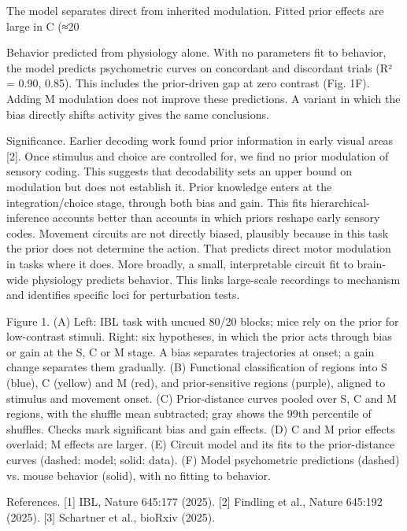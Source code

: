 \documentclass[12pt]{article}
\begin{document}
The model separates direct from inherited modulation. Fitted prior effects are large in C (≈20%

Behavior predicted from physiology alone. With no parameters fit to behavior, the model predicts psychometric curves on concordant and discordant trials (R² = 0.90, 0.85). This includes the prior-driven gap at zero contrast (Fig. 1F). Adding M modulation does not improve these predictions. A variant in which the bias directly shifts activity gives the same conclusions.

Significance. Earlier decoding work found prior information in early visual areas [2]. Once stimulus and choice are controlled for, we find no prior modulation of sensory coding. This suggests that decodability sets an upper bound on modulation but does not establish it. Prior knowledge enters at the integration/choice stage, through both bias and gain. This fits hierarchical-inference accounts better than accounts in which priors reshape early sensory codes. Movement circuits are not directly biased, plausibly because in this task the prior does not determine the action. That predicts direct motor modulation in tasks where it does. More broadly, a small, interpretable circuit fit to brain-wide physiology predicts behavior. This links large-scale recordings to mechanism and identifies specific loci for perturbation tests.

Figure 1. (A) Left: IBL task with uncued 80/20 blocks; mice rely on the prior for low-contrast stimuli. Right: six hypotheses, in which the prior acts through bias or gain at the S, C or M stage. A bias separates trajectories at onset; a gain change separates them gradually. (B) Functional classification of regions into S (blue), C (yellow) and M (red), and prior-sensitive regions (purple), aligned to stimulus and movement onset. (C) Prior-distance curves pooled over S, C and M regions, with the shuffle mean subtracted; gray shows the 99th percentile of shuffles. Checks mark significant bias and gain effects. (D) C and M prior effects overlaid; M effects are larger. (E) Circuit model and its fits to the prior-distance curves (dashed: model; solid: data). (F) Model psychometric predictions (dashed) vs. mouse behavior (solid), with no fitting to behavior.

References. [1] IBL, Nature 645:177 (2025). [2] Findling et al., Nature 645:192 (2025). [3] Schartner et al., bioRxiv (2025).

\end{document}
